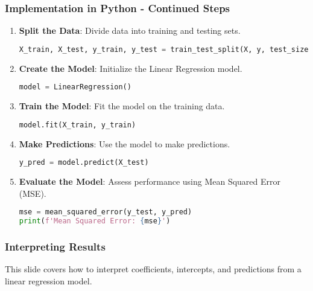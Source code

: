 \documentclass[aspectratio=169]{beamer}
\begin{document}
\begin{frame}[fragile]
    \frametitle{Implementation in Python - Continued Steps}
    \begin{enumerate}[resume]
        \item \textbf{Split the Data}: Divide data into training and testing sets.

        \begin{lstlisting}[language=Python]
X_train, X_test, y_train, y_test = train_test_split(X, y, test_size=0.2, random_state=42)
        \end{lstlisting}

        \item \textbf{Create the Model}: Initialize the Linear Regression model.

        \begin{lstlisting}[language=Python]
model = LinearRegression()
        \end{lstlisting}

        \item \textbf{Train the Model}: Fit the model on the training data.

        \begin{lstlisting}[language=Python]
model.fit(X_train, y_train)
        \end{lstlisting}

        \item \textbf{Make Predictions}: Use the model to make predictions.

        \begin{lstlisting}[language=Python]
y_pred = model.predict(X_test)
        \end{lstlisting}

        \item \textbf{Evaluate the Model}: Assess performance using Mean Squared Error (MSE).

        \begin{lstlisting}[language=Python]
mse = mean_squared_error(y_test, y_pred)
print(f'Mean Squared Error: {mse}')
        \end{lstlisting}
    \end{enumerate}
\end{frame}

\begin{frame}[fragile]
    \frametitle{Interpreting Results}
    This slide covers how to interpret coefficients, intercepts, and predictions from a linear regression model.
\end{frame}
\end{document}
